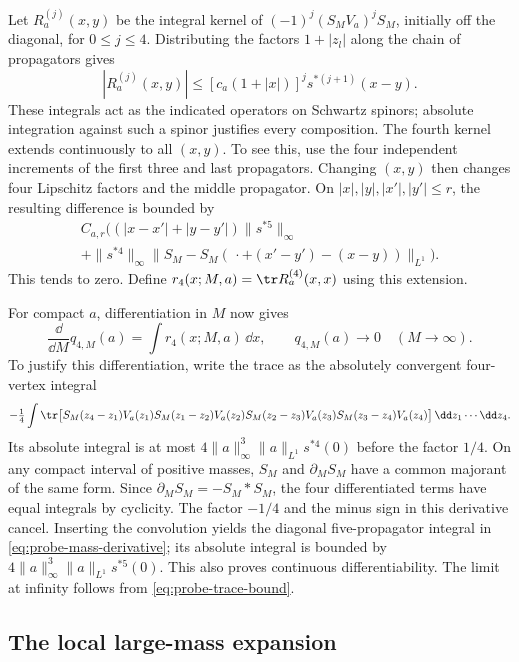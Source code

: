 \documentclass[11pt,letterpaper,reqno]{amsart}
\begin{document}
Let $R_a^{(j)}(x,y)$ be the integral kernel of
$(-1)^j(S_MV_a)^jS_M$, initially off the diagonal, for $0\le j\le4$.
Distributing the factors $1+|z_l|$ along the chain of propagators gives
\begin{equation}\label{eq:probe-kernel-majorant}
 |R_a^{(j)}(x,y)|\le[c_a(1+|x|)]^j s^{*(j+1)}(x-y).
\end{equation}
These integrals act as the indicated operators on Schwartz spinors;
absolute integration against such a spinor justifies every composition.
The fourth kernel extends continuously to all $(x,y)$. To see this,
use the four independent increments of the first three and last
propagators. Changing $(x,y)$ then changes four Lipschitz factors and
the middle propagator. On $|x|,|y|,|x'|,|y'|\le r$, the resulting
difference is bounded by
\begin{multline}\label{eq:probe-kernel-continuity}
 C_{a,r}\bigl((|x-x'|+|y-y'|)\|s^{*5}\|_\infty\\
 +\|s^{*4}\|_\infty
       \|S_M-S_M(\,\cdot+(x'-y')-(x-y))\|_{L^1}\bigr).
\end{multline}
This tends to zero. Define
$r_4(x;M,a)=\tr R_a^{(4)}(x,x)$ using this extension.

For compact $a$, differentiation in $M$ now gives
\begin{equation}\label{eq:probe-mass-derivative}
 \frac{\dd}{\dd M}q_{4,M}(a)=\int r_4(x;M,a)\,\dd x,
 \qquad q_{4,M}(a)\longrightarrow0\quad(M\longrightarrow\infty).
\end{equation}
To justify this differentiation, write the trace as the absolutely convergent
four-vertex integral
\[
 -\tfrac14\int\tr\bigl[S_M(z_4-z_1)V_a(z_1)
 S_M(z_1-z_2)V_a(z_2)S_M(z_2-z_3)V_a(z_3)
 S_M(z_3-z_4)V_a(z_4)\bigr]\,\dd z_1\cdots\dd z_4.
\]
Its absolute integral is at most
$4\|a\|_\infty^3\|a\|_{L^1}s^{*4}(0)$ before the factor $1/4$.
On any compact interval of positive masses, $S_M$ and
$\partial_MS_M$ have a common majorant of the same form. Since
$\partial_MS_M=-S_M*S_M$, the four differentiated terms have equal
integrals by cyclicity. The factor $-1/4$ and the minus sign in this
derivative cancel. Inserting the convolution yields the diagonal
five-propagator integral in \eqref{eq:probe-mass-derivative}; its absolute
integral is bounded by $4\|a\|_\infty^3\|a\|_{L^1}s^{*5}(0)$.
This also proves continuous differentiability. The limit at infinity
follows from \eqref{eq:probe-trace-bound}.

\subsection{The local large-mass expansion}
\end{document}
